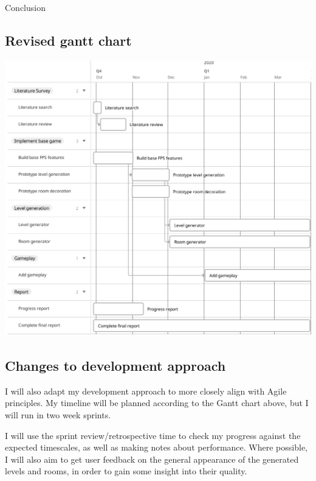 \documentclass[review]{cmpreport}
\begin{document}
\begin{section}{Conclusion}
\subsection{Revised gantt chart}
\begin{center}
\includegraphics[width=\textwidth,height=\textheight,keepaspectratio]{gantt.PNG}
\end{center}

\subsection{Changes to development approach}
I will also adapt my development approach to more closely align with Agile principles. My timeline will be planned according to the Gantt chart above, but I will run in two week sprints. \par
I will use the sprint review/retrospective time to check my progress against the expected timescales, as well as making notes about performance. Where possible, I will also aim to get user feedback on the general appearance of the generated levels and rooms, in order to gain some insight into their quality.

\end{section}



\end{document}
